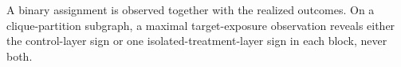 A binary assignment is observed together with the realized outcomes.  On a clique-partition subgraph, a maximal target-exposure observation reveals either the control-layer sign or one isolated-treatment-layer sign in each block, never both.